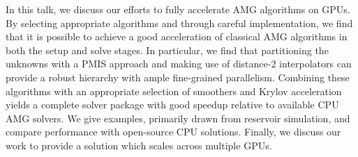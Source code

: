 \documentclass{report}
\begin{document}
In this talk, we discuss our efforts to fully accelerate AMG
algorithms on GPUs. By selecting appropriate algorithms and through
careful implementation, we find that it is possible to achieve a good
acceleration of classical AMG algorithms in both the setup and solve
stages. In particular, we find that partitioning the unknowns with a PMIS
approach and making use of distance-2 interpolators can provide a robust
hierarchy with ample fine-grained parallelism. Combining these algorithms
with an appropriate selection of smoothers and Krylov acceleration yields
a complete solver package with good speedup relative to available CPU AMG
solvers. We give examples, primarily drawn from reservoir simulation, and
compare performance with open-source CPU solutions. Finally, we discuss
our work to provide a solution which scales across multiple GPUs.
\end{document}
